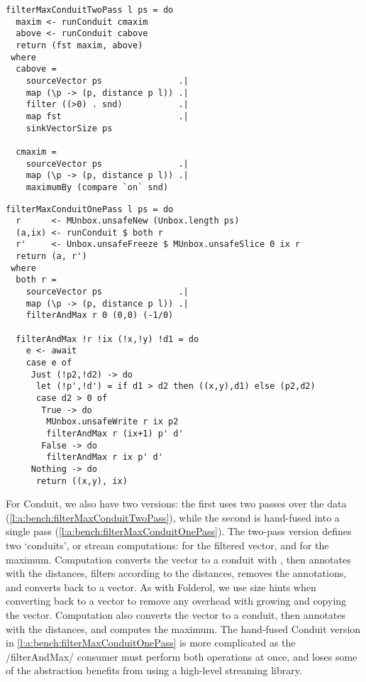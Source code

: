 \begin{lstlisting}[float,label=l:a:bench:filterMaxConduitTwoPass,caption=Conduit two-pass implementation of \Hs/filterMax/]
filterMaxConduitTwoPass l ps = do
  maxim <- runConduit cmaxim
  above <- runConduit cabove
  return (fst maxim, above)
 where
  cabove =
    sourceVector ps               .|
    map (\p -> (p, distance p l)) .|
    filter ((>0) . snd)           .|
    map fst                       .|
    sinkVectorSize ps

  cmaxim =
    sourceVector ps               .|
    map (\p -> (p, distance p l)) .|
    maximumBy (compare `on` snd)
\end{lstlisting}

\begin{lstlisting}[float,label=l:a:bench:filterMaxConduitOnePass,caption=Conduit one-pass (hand-fused) implementation of \Hs/filterMax/]
filterMaxConduitOnePass l ps = do
  r      <- MUnbox.unsafeNew (Unbox.length ps)
  (a,ix) <- runConduit $ both r
  r'     <- Unbox.unsafeFreeze $ MUnbox.unsafeSlice 0 ix r
  return (a, r')
 where
  both r =
    sourceVector ps               .|
    map (\p -> (p, distance p l)) .|
    filterAndMax r 0 (0,0) (-1/0)

  filterAndMax !r !ix (!x,!y) !d1 = do
    e <- await
    case e of
     Just (!p2,!d2) -> do
      let (!p',!d') = if d1 > d2 then ((x,y),d1) else (p2,d2)
      case d2 > 0 of
       True -> do
        MUnbox.unsafeWrite r ix p2
        filterAndMax r (ix+1) p' d'
       False -> do
        filterAndMax r ix p' d'
     Nothing -> do
      return ((x,y), ix)
\end{lstlisting}

For Conduit, we also have two versions: the first uses two passes over the data (\cref{l:a:bench:filterMaxConduitTwoPass}), while the second is hand-fused into a single pass (\cref{l:a:bench:filterMaxConduitOnePass}).
The two-pass version defines two `conduits', or stream computations: \Hs@cabove@ for the filtered vector, and \Hs@cmaxim@ for the maximum.
Computation \Hs@cabove@ converts the vector to a conduit with \Hs@sourceVector@, then annotates with the distances, filters according to the distances, removes the annotations, and converts back to a vector.
As with Folderol, we use size hints when converting back to a vector to remove any overhead with growing and copying the vector.
Computation \Hs@cmaxim@ also converts the vector to a conduit, then annotates with the distances, and computes the maximum.
The hand-fused Conduit version in \cref{l:a:bench:filterMaxConduitOnePass} is more complicated as the \Hs/filterAndMax/ consumer must perform both operations at once, and loses some of the abstraction benefits from using a high-level streaming library.

